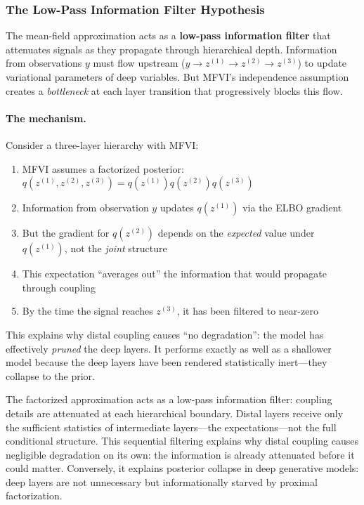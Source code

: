\documentclass[10pt]{article} %
\theoremstyle{plain}
\theoremstyle{definition}
\begin{document}
\subsubsection{The Low-Pass Information Filter Hypothesis}

\begin{tcolorbox}[breakable, colback=yellow!5, colframe=yellow!50!black, title=\textbf{Key Insight: MFVI as Information Filter}, fonttitle=\bfseries]
The mean-field approximation acts as a \textbf{low-pass information filter} that attenuates signals as they propagate through hierarchical depth. Information from observations $y$ must flow upstream ($y \to z^{(1)} \to z^{(2)} \to z^{(3)}$) to update variational parameters of deep variables. But MFVI's independence assumption creates a \emph{bottleneck} at each layer transition that progressively blocks this flow.
\end{tcolorbox}

\paragraph{The mechanism.} Consider a three-layer hierarchy with MFVI:
\begin{enumerate}
    \item MFVI assumes a factorized posterior: $q(z^{(1)}, z^{(2)}, z^{(3)}) = q(z^{(1)})q(z^{(2)})q(z^{(3)})$
    \item Information from observation $y$ updates $q(z^{(1)})$ via the ELBO gradient
    \item But the gradient for $q(z^{(2)})$ depends on the \emph{expected} value under $q(z^{(1)})$, not the \emph{joint} structure
    \item This expectation ``averages out'' the information that would propagate through coupling
    \item By the time the signal reaches $z^{(3)}$, it has been filtered to near-zero
\end{enumerate}

This explains why distal coupling causes ``no degradation'': the model has effectively \emph{pruned} the deep layers. It performs exactly as well as a shallower model because the deep layers have been rendered statistically inert---they collapse to the prior.

The factorized approximation acts as a low-pass information filter: coupling details are attenuated at each hierarchical boundary. Distal layers receive only the sufficient statistics of intermediate layers---the expectations---not the full conditional structure. This sequential filtering explains why distal coupling causes negligible degradation on its own: the information is already attenuated before it could matter. Conversely, it explains posterior collapse in deep generative models: deep layers are not unnecessary but informationally starved by proximal factorization.
\end{document}
